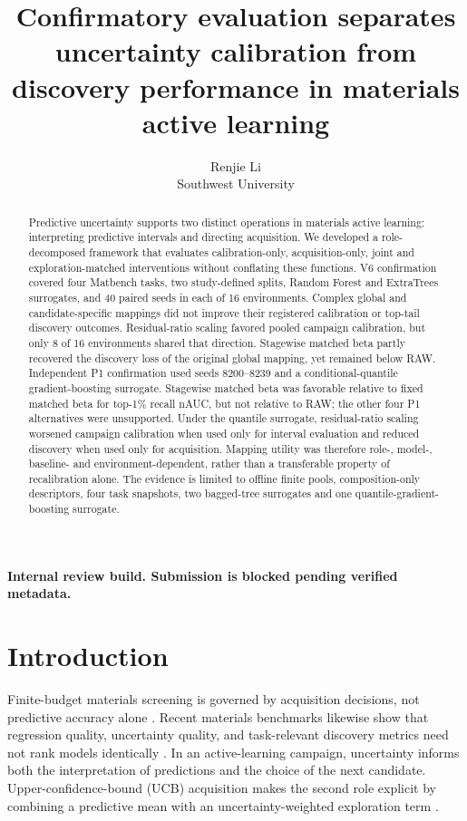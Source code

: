 \documentclass[10pt,twocolumn]{article}
\title{Confirmatory evaluation separates uncertainty calibration from discovery performance in materials active learning}
\author{Renjie Li\\[2pt]\normalsize Southwest University}
\date{}
\begin{document}
\maketitle
\begin{center}\small\textbf{Internal review build. Submission is blocked pending verified metadata.}\end{center}

\begin{abstract}
Predictive uncertainty supports two distinct operations in materials active learning: interpreting predictive intervals and directing acquisition. We developed a role-decomposed framework that evaluates calibration-only, acquisition-only, joint and exploration-matched interventions without conflating these functions. V6 confirmation covered four Matbench tasks, two study-defined splits, Random Forest and ExtraTrees surrogates, and 40 paired seeds in each of 16 environments. Complex global and candidate-specific mappings did not improve their registered calibration or top-tail discovery outcomes. Residual-ratio scaling favored pooled campaign calibration, but only 8 of 16 environments shared that direction. Stagewise matched beta partly recovered the discovery loss of the original global mapping, yet remained below RAW. Independent P1 confirmation used seeds 8200--8239 and a conditional-quantile gradient-boosting surrogate. Stagewise matched beta was favorable relative to fixed matched beta for top-1\% recall nAUC, but not relative to RAW; the other four P1 alternatives were unsupported. Under the quantile surrogate, residual-ratio scaling worsened campaign calibration when used only for interval evaluation and reduced discovery when used only for acquisition. Mapping utility was therefore role-, model-, baseline- and environment-dependent, rather than a transferable property of recalibration alone. The evidence is limited to offline finite pools, composition-only descriptors, four task snapshots, two bagged-tree surrogates and one quantile-gradient-boosting surrogate.
\end{abstract}

\section{Introduction}
Finite-budget materials screening is governed by acquisition decisions, not
predictive accuracy alone
\citep{lookman2019active,xue2016adaptive,kusne2020closedloop,rohr2020metrics,hase2021olympus}.
Recent materials benchmarks likewise show that regression quality, uncertainty
quality, and task-relevant discovery metrics need not rank models identically
\citep{varivoda2023uq,riebesell2025matbenchdiscovery}. In an active-learning
campaign, uncertainty informs both the interpretation of predictions and the
choice of the next candidate. Upper-confidence-bound (UCB) acquisition makes
the second role explicit by combining a predictive mean with an
uncertainty-weighted exploration term
\citep{auer2002ucb,srinivas2010gpucb,shahriari2016bo,frazier2018tutorial}.
\end{document}
